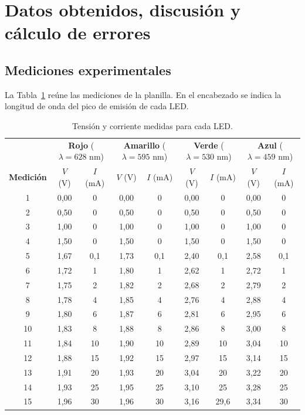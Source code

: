 \documentclass{article}
\begin{document}
\section{Datos obtenidos, discusión y cálculo de errores}

\subsection{Mediciones experimentales}

La Tabla~\ref{tab:datos} reúne las mediciones de la planilla. En el encabezado se indica la longitud de onda del pico de emisión de cada LED.

\begin{table}[H]
\centering\small
\caption{Tensión y corriente medidas para cada LED.}
\label{tab:datos}
\begin{tabular}{@{}c|cc|cc|cc|cc@{}}
\toprule
 & \multicolumn{2}{c|}{\textbf{Rojo} ($\lambda=628$ nm)} & \multicolumn{2}{c|}{\textbf{Amarillo} ($\lambda=595$ nm)} & \multicolumn{2}{c|}{\textbf{Verde} ($\lambda=530$ nm)} & \multicolumn{2}{c}{\textbf{Azul} ($\lambda=459$ nm)}\\
\textbf{Medición} & $V$ (V) & $I$ (mA) & $V$ (V) & $I$ (mA) & $V$ (V) & $I$ (mA) & $V$ (V) & $I$ (mA)\\
\midrule
1  & 0,00 & 0   & 0,00 & 0   & 0,00 & 0    & 0,00 & 0\\
2  & 0,50 & 0   & 0,50 & 0   & 0,50 & 0    & 0,50 & 0\\
3  & 1,00 & 0   & 1,00 & 0   & 1,00 & 0    & 1,00 & 0\\
4  & 1,50 & 0   & 1,50 & 0   & 1,50 & 0    & 1,50 & 0\\
5  & 1,67 & 0,1 & 1,73 & 0,1 & 2,40 & 0,1  & 2,58 & 0,1\\
6  & 1,72 & 1   & 1,80 & 1   & 2,62 & 1    & 2,72 & 1\\
7  & 1,75 & 2   & 1,82 & 2   & 2,68 & 2    & 2,79 & 2\\
8  & 1,78 & 4   & 1,85 & 4   & 2,76 & 4    & 2,88 & 4\\
9  & 1,80 & 6   & 1,87 & 6   & 2,81 & 6    & 2,95 & 6\\
10 & 1,83 & 8   & 1,88 & 8   & 2,86 & 8    & 3,00 & 8\\
11 & 1,84 & 10  & 1,90 & 10  & 2,89 & 10   & 3,04 & 10\\
12 & 1,88 & 15  & 1,92 & 15  & 2,97 & 15   & 3,14 & 15\\
13 & 1,91 & 20  & 1,93 & 20  & 3,04 & 20   & 3,22 & 20\\
14 & 1,93 & 25  & 1,95 & 25  & 3,10 & 25   & 3,28 & 25\\
15 & 1,96 & 30  & 1,96 & 30  & 3,16 & 29,6 & 3,34 & 30\\
\bottomrule
\end{tabular}
\end{table}
\end{document}
